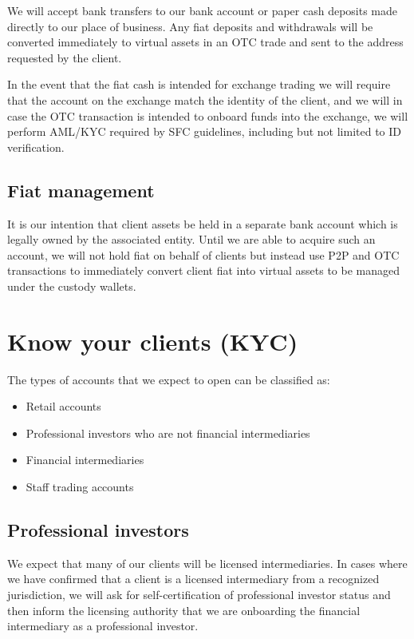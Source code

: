 {We will accept bank transfers to our bank account or paper cash
deposits made directly to our place of business.  Any fiat deposits
and withdrawals will be converted immediately to virtual assets in an
OTC trade and sent to the address requested by the client.

In the event that the fiat cash is intended for exchange trading we
will require that the account on the exchange match the identity of
the client, and we will in case the OTC transaction is intended to
onboard funds into the exchange, we will perform AML/KYC required by
SFC guidelines, including but not limited to ID verification.

\subsection{Fiat management}
It is our intention that client assets be held in a separate bank
account which is legally owned by the associated entity.  Until we are
able to acquire such an account, we will not hold fiat on behalf of
clients but instead use P2P and OTC transactions to immediately
convert client fiat into virtual assets to be managed under the
custody wallets.
}

\section{Know your clients (KYC)}

The types of accounts that we expect to open can be classified as:

\begin{itemize}
\item Retail accounts
\item Professional investors who are not financial intermediaries
\item Financial intermediaries
\item Staff trading accounts
  \end{itemize}

\subsection{Professional investors}

We expect that many of our clients will be licensed intermediaries.
In cases where we have confirmed that a client is a licensed
intermediary from a recognized jurisdiction, we will ask for
self-certification of professional investor status and then inform the
licensing authority that we are onboarding the financial intermediary
as a professional investor.

